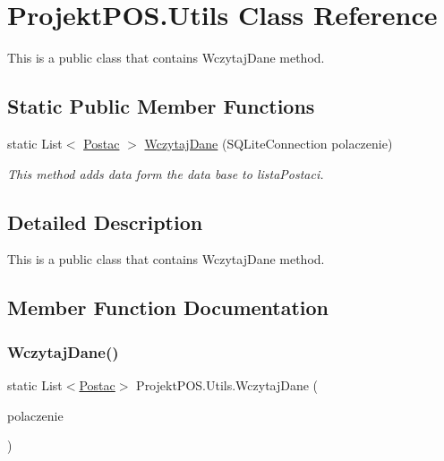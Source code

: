 \hypertarget{class_projekt_p_o_s_1_1_utils}{}\section{Projekt\+P\+O\+S.\+Utils Class Reference}
\label{class_projekt_p_o_s_1_1_utils}


This is a public class that contains Wczytaj\+Dane method.  


\subsection*{Static Public Member Functions}
\begin{DoxyCompactItemize}
\item 
static List$<$ \hyperlink{class_projekt_p_o_s_1_1_postac}{Postac} $>$ \hyperlink{class_projekt_p_o_s_1_1_utils_aeff22c22eb442573e4899eea9bcd2d11}{Wczytaj\+Dane} (S\+Q\+Lite\+Connection polaczenie)
\begin{DoxyCompactList}\small\item\em This method adds data form the data base to lista\+Postaci. \end{DoxyCompactList}\end{DoxyCompactItemize}


\subsection{Detailed Description}
This is a public class that contains Wczytaj\+Dane method. 



\subsection{Member Function Documentation}
\mbox{\label{class_projekt_p_o_s_1_1_utils_aeff22c22eb442573e4899eea9bcd2d11}} 
\subsubsection{\texorpdfstring{Wczytaj\+Dane()}{WczytajDane()}}
{\footnotesize\ttfamily static List$<$\hyperlink{class_projekt_p_o_s_1_1_postac}{Postac}$>$ Projekt\+P\+O\+S.\+Utils.\+Wczytaj\+Dane (\begin{DoxyParamCaption}\item[{S\+Q\+Lite\+Connection}]{polaczenie }\end{DoxyParamCaption})\hspace{0.3cm}{\ttfamily [static]}}



